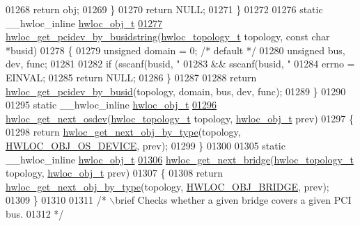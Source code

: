 \begin{DoxyCode}
01268       \textcolor{keywordflow}{return} obj;
01269   \}
01270   \textcolor{keywordflow}{return} NULL;
01271 \}
01272 
01276 \textcolor{keyword}{static} \_\_hwloc\_inline \hyperlink{a00016}{hwloc_obj_t}
\hypertarget{a00031_source_l01277}{}\hyperlink{a00064_ga9d5643f2e337fe1b98e7cce5c1ecb74e}{01277} \hyperlink{a00064_ga9d5643f2e337fe1b98e7cce5c1ecb74e}{hwloc_get_pcidev_by_busidstring}(\hyperlink{a00039_ga9d1e76ee15a7dee158b786c30b6a6e38}{hwloc_topology_t} topology, \textcolor{keyword}{const} \textcolor{keywordtype}{char} *busid)
01278 \{
01279   \textcolor{keywordtype}{unsigned} domain = 0; \textcolor{comment}{/* default */}
01280   \textcolor{keywordtype}{unsigned} bus, dev, func;
01281 
01282   \textcolor{keywordflow}{if} (sscanf(busid, \textcolor{stringliteral}{"%
01283       && sscanf(busid, \textcolor{stringliteral}{"%
01284     errno = EINVAL;
01285     \textcolor{keywordflow}{return} NULL;
01286   \}
01287 
01288   \textcolor{keywordflow}{return} \hyperlink{a00064_ga546e1d690c63fb24177f3013ed78ceb1}{hwloc_get_pcidev_by_busid}(topology, domain, bus, dev, func);
01289 \}
01290 
01295 \textcolor{keyword}{static} \_\_hwloc\_inline \hyperlink{a00016}{hwloc_obj_t}
\hypertarget{a00031_source_l01296}{}\hyperlink{a00064_ga73a5bc6265642e6001f7a10812ab886d}{01296} \hyperlink{a00064_ga73a5bc6265642e6001f7a10812ab886d}{hwloc_get_next_osdev}(\hyperlink{a00039_ga9d1e76ee15a7dee158b786c30b6a6e38}{hwloc_topology_t} topology, \hyperlink{a00016}{hwloc_obj_t} prev)
01297 \{
01298   \textcolor{keywordflow}{return} \hyperlink{a00053_ga5f08ceb69375341e73563cfe2e77534e}{hwloc_get_next_obj_by_type}(topology, \hyperlink{a00041_ggacd37bb612667dc437d66bfb175a8dc55a51e7280240fd9f25589cbbe538bdb075}{HWLOC_OBJ_OS_DEVICE}, prev);
01299 \}
01300 
01305 \textcolor{keyword}{static} \_\_hwloc\_inline \hyperlink{a00016}{hwloc_obj_t}
\hypertarget{a00031_source_l01306}{}\hyperlink{a00064_ga2bd3f856d0fc3c6c02642c17d763b823}{01306} \hyperlink{a00064_ga2bd3f856d0fc3c6c02642c17d763b823}{hwloc_get_next_bridge}(\hyperlink{a00039_ga9d1e76ee15a7dee158b786c30b6a6e38}{hwloc_topology_t} topology, \hyperlink{a00016}{hwloc_obj_t} prev)
01307 \{
01308   \textcolor{keywordflow}{return} \hyperlink{a00053_ga5f08ceb69375341e73563cfe2e77534e}{hwloc_get_next_obj_by_type}(topology, \hyperlink{a00041_ggacd37bb612667dc437d66bfb175a8dc55a6825f10895fea60aca7a6ba9fe273db0}{HWLOC_OBJ_BRIDGE}, prev);
01309 \}
01310 
01311 \textcolor{comment}{/* \(\backslash\)brief Checks whether a given bridge covers a given PCI bus.}
01312 \textcolor{comment}{ */}
}}
\end{DoxyCode}

